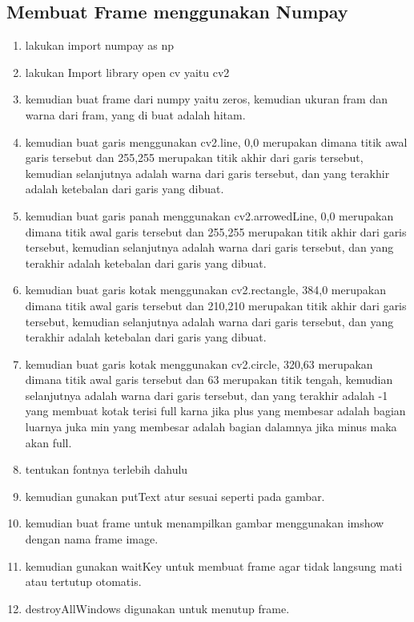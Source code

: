 \subsection{Membuat Frame menggunakan Numpay}

\begin{enumerate}
	\item lakukan import numpay as np
	\item lakukan Import library open cv yaitu cv2
	\item kemudian buat frame dari numpy yaitu zeros, kemudian ukuran fram dan warna dari fram, yang di buat adalah hitam.
	\item kemudian buat garis menggunakan cv2.line, 0,0 merupakan dimana titik awal garis tersebut dan 255,255 merupakan titik akhir dari garis tersebut, kemudian selanjutnya adalah warna dari garis tersebut, dan yang terakhir adalah ketebalan dari garis yang dibuat.
	\item kemudian buat garis panah menggunakan cv2.arrowedLine, 0,0 merupakan dimana titik awal garis tersebut dan 255,255 merupakan titik akhir dari garis tersebut, kemudian selanjutnya adalah warna dari garis tersebut, dan yang terakhir adalah ketebalan dari garis yang dibuat.
	\item kemudian buat garis kotak menggunakan cv2.rectangle, 384,0 merupakan dimana titik awal garis tersebut dan 210,210 merupakan titik akhir dari garis tersebut, kemudian selanjutnya adalah warna dari garis tersebut, dan yang terakhir adalah ketebalan dari garis yang dibuat.
	\item kemudian buat garis kotak menggunakan cv2.circle, 320,63 merupakan dimana titik awal garis tersebut dan 63 merupakan titik tengah, kemudian selanjutnya adalah warna dari garis tersebut, dan yang terakhir adalah -1 yang membuat kotak terisi full karna jika plus yang membesar adalah bagian luarnya juka min yang membesar adalah bagian dalamnya jika minus maka akan full.
	\item tentukan fontnya terlebih dahulu
	\item kemudian gunakan putText atur sesuai seperti pada gambar.
	\item kemudian buat frame untuk menampilkan gambar menggunakan imshow dengan nama frame image.
	\item kemudian gunakan waitKey untuk membuat frame agar tidak langsung mati atau tertutup otomatis.
	\item destroyAllWindows digunakan untuk menutup frame.
\end{enumerate}

